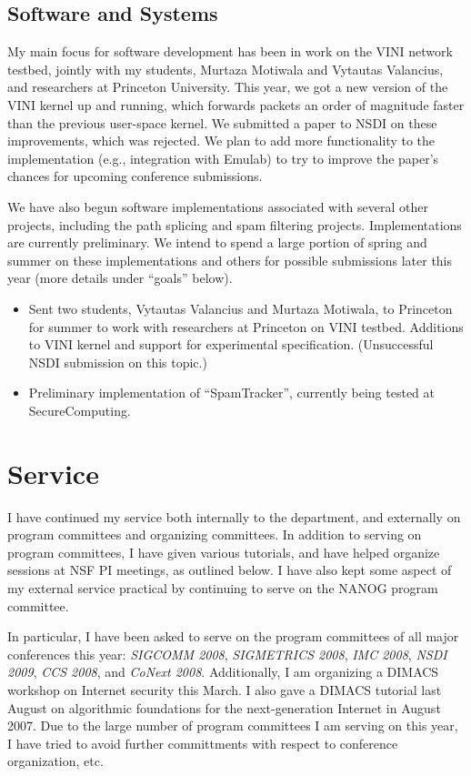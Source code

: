 \begin{sloppypar}
\subsection*{Software and Systems}

My main focus for software development has been in work on the VINI
network testbed, jointly with my students, Murtaza Motiwala and Vytautas
Valancius, and researchers at Princeton University.  This year, we got a
new version of the VINI kernel up and running, which forwards packets an
order of magnitude faster than the previous user-space kernel.  We
submitted a paper to NSDI on these improvements, which was rejected.  We
plan to add more functionality to the implementation (e.g., integration
with Emulab) to try to improve the paper's chances for upcoming
conference submissions.

We have also begun software implementations associated with several
other projects, including the path splicing and spam filtering
projects.  Implementations are currently preliminary.  We intend to
spend a large portion of spring and summer on these implementations and
others for possible submissions later this year (more details under
``goals'' below).

\begin{itemize}
\itemsep=-1pt
\item Sent two students, Vytautas Valancius and Murtaza Motiwala, to
  Princeton for summer to work with researchers at Princeton on VINI
  testbed.  Additions to VINI kernel and support for experimental
  specification.  (Unsuccessful NSDI submission on this topic.)
\item Preliminary implementation of ``SpamTracker'', currently being
  tested at SecureComputing.
\end{itemize}

\section*{Service}

I have continued my service both internally to the department, and
externally on program committees and organizing committees.  In addition
to serving on program committees, I have given various tutorials, and
have helped organize sessions at NSF PI meetings, as outlined below.  I
have also kept some aspect of my external service practical by
continuing to serve on the NANOG program committee.  

In particular, I have been asked to serve on the program committees of
all major conferences this year: {\em SIGCOMM 2008}, {\em SIGMETRICS
2008}, {\em IMC 2008}, {\em NSDI 2009}, {\em CCS 2008}, and {\em CoNext
2008}.  Additionally, I am organizing a DIMACS workshop on Internet
security this March.  I also gave a DIMACS tutorial last August on
algorithmic foundations for the next-generation Internet in August 2007.
Due to the large number of program committees I am serving on this year,
I have tried to avoid further committments with respect to conference
organization, etc.


\end{sloppypar}
